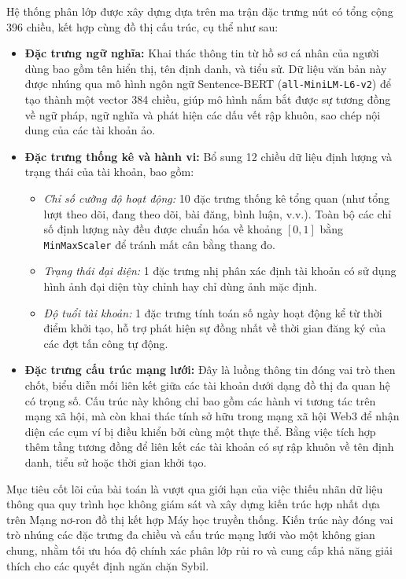 Hệ thống phân lớp được xây dựng dựa trên ma trận đặc trưng nút có tổng cộng 396 chiều, kết hợp cùng đồ thị cấu trúc, cụ thể như sau:
\vspace{-0.1cm}
\begin{itemize}[label={--}, itemsep=1pt]
    \item \textbf{Đặc trưng ngữ nghĩa:} Khai thác thông tin từ hồ sơ cá nhân của người dùng bao gồm tên hiển thị, tên định danh, và tiểu sử. Dữ liệu văn bản này được nhúng qua mô hình ngôn ngữ Sentence-BERT (\texttt{all-MiniLM-L6-v2}) để tạo thành một vector 384 chiều, giúp mô hình nắm bắt được sự tương đồng về ngữ pháp, ngữ nghĩa và phát hiện các dấu vết rập khuôn, sao chép nội dung của các tài khoản ảo.
    
    \item \textbf{Đặc trưng thống kê và hành vi:} Bổ sung 12 chiều dữ liệu định lượng và trạng thái của tài khoản, bao gồm:
    \begin{itemize}[label={+}, itemsep=1pt]
        \item \textit{Chỉ số cường độ hoạt động:} 10 đặc trưng thống kê tổng quan (như tổng lượt theo dõi, đang theo dõi, bài đăng, bình luận, v.v.). Toàn bộ các chỉ số định lượng này đều được chuẩn hóa về khoảng $[0, 1]$ bằng \texttt{MinMaxScaler} để tránh mất cân bằng thang đo.
        \item \textit{Trạng thái đại diện:} 1 đặc trưng nhị phân xác định tài khoản có sử dụng hình ảnh đại diện tùy chỉnh hay chỉ dùng ảnh mặc định.
        \item \textit{Độ tuổi tài khoản:} 1 đặc trưng tính toán số ngày hoạt động kể từ thời điểm khởi tạo, hỗ trợ phát hiện sự đồng nhất về thời gian đăng ký của các đợt tấn công tự động.
    \end{itemize}
    
    \item \textbf{Đặc trưng cấu trúc mạng lưới:} Đây là luồng thông tin đóng vai trò then chốt, biểu diễn mối liên kết giữa các tài khoản dưới dạng đồ thị đa quan hệ có trọng số. Cấu trúc này không chỉ bao gồm các hành vi tương tác trên mạng xã hội, mà còn khai thác tính sở hữu trong mạng xã hội Web3 để nhận diện các cụm ví bị điều khiển bởi cùng một thực thể. Bằng việc tích hợp thêm tầng tương đồng để liên kết các tài khoản có sự rập khuôn về tên định danh, tiểu sử hoặc thời gian khởi tạo.
\end{itemize}

Mục tiêu cốt lõi của bài toán là vượt qua giới hạn của việc thiếu nhãn dữ liệu thông qua quy trình học không giám sát và xây dựng kiến trúc hợp nhất dựa trên Mạng nơ-ron đồ thị kết hợp Máy học truyền thống. Kiến trúc này đóng vai trò nhúng các đặc trưng đa chiều và cấu trúc mạng lưới vào một không gian chung, nhằm tối ưu hóa độ chính xác phân lớp rủi ro và cung cấp khả năng giải thích cho các quyết định ngăn chặn Sybil.

